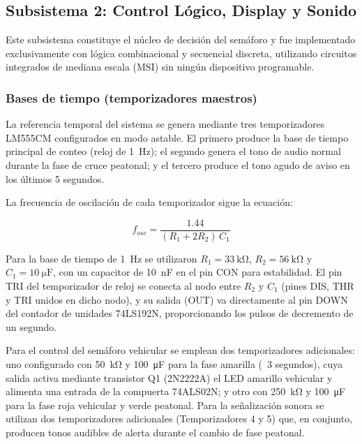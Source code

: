 \documentclass[10pt,onecolumn]{IEEEtran}
\begin{document}
\subsection{Subsistema 2: Control Lógico, Display y Sonido}
\label{subsec:control}

Este subsistema constituye el núcleo de decisión del semáforo y fue implementado exclusivamente con lógica combinacional y secuencial discreta, utilizando circuitos integrados de mediana escala (MSI) sin ningún dispositivo programable.

\subsubsection{Bases de tiempo (temporizadores maestros)}

La referencia temporal del sistema se genera mediante tres temporizadores LM555CM configurados en modo astable. El primero produce la base de tiempo principal de conteo (reloj de \SI{1}{\hertz}); el segundo genera el tono de audio normal durante la fase de cruce peatonal; y el tercero produce el tono agudo de aviso en los últimos 5 segundos.

La frecuencia de oscilación de cada temporizador sigue la ecuación:

\begin{equation}
f_{osc} = \frac{1.44}{(R_1 + 2R_2)\,C_1}
\label{eq:555_astable}
\end{equation}

Para la base de tiempo de \SI{1}{\hertz} se utilizaron $R_1 = \SI{33}{\kilo\ohm}$, $R_2 = \SI{56}{\kilo\ohm}$ y $C_1 = \SI{10}{\micro\farad}$, con un capacitor de \SI{10}{\nano\farad} en el pin CON para estabilidad. El pin TRI del temporizador de reloj se conecta al nodo entre $R_2$ y $C_1$ (pines DIS, THR y TRI unidos en dicho nodo), y su salida (OUT) va directamente al pin DOWN del contador de unidades 74LS192N, proporcionando los pulsos de decremento de un segundo.

Para el control del semáforo vehicular se emplean dos temporizadores adicionales: uno configurado con \SI{50}{\kilo\ohm} y \SI{100}{\micro\farad} para la fase amarilla (~3 segundos), cuya salida activa mediante transistor Q1 (2N2222A) el LED amarillo vehicular y alimenta una entrada de la compuerta 74ALS02N; y otro con \SI{250}{\kilo\ohm} y \SI{100}{\micro\farad} para la fase roja vehicular y verde peatonal. Para la señalización sonora se utilizan dos temporizadores adicionales (Temporizadores 4 y 5) que, en conjunto, producen tonos audibles de alerta durante el cambio de fase peatonal.
\end{document}
